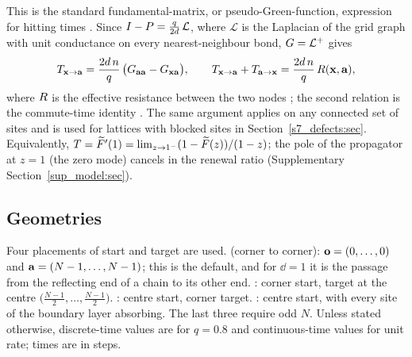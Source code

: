 This is the standard fundamental-matrix, or pseudo-Green-function, expression for hitting times
\citep{AldousFill,Condamin2005,Condamin2007PRE}. Since $I-P=\frac{q}{2d}\,\mathcal L$, where $\mathcal L$ is the
Laplacian of the grid graph with unit conductance on every nearest-neighbour bond, $G=\mathcal L^{+}$ gives
\begin{equation}\label{s2_model:eq-resistance}
  T_{\mathbf{x}\to\mathbf{a}}=\frac{2d\,n}{q}\,\bigl(G_{\mathbf{a}\mathbf{a}}-G_{\mathbf{x}\mathbf{a}}\bigr),\qquad
  T_{\mathbf{x}\to\mathbf{a}}+T_{\mathbf{a}\to\mathbf{x}}=\frac{2d\,n}{q}\,R(\mathbf{x},\mathbf{a}),
\end{equation}
where $R$ is the effective resistance between the two nodes \citep{KleinRandic1993}; the second relation is the
commute-time identity \citep{Chandra1989,Tetali1991,LevinPeresWilmer2009}. The same argument applies on any connected
set of sites and is used for lattices with blocked sites in Section~\ref{s7_defects:sec}. Equivalently,
$T=\widetilde{F}'(1)=\lim_{z\to1^{-}}(1-\widetilde{F}(z))/(1-z)$; the pole of the propagator at $z=1$ (the zero mode) cancels in the
renewal ratio (Supplementary Section~\ref{sup_model:sec}).

\subsection{Geometries}\label{s2_model:ssec-geom}

Four placements of start and target are used. \CC{} (corner to corner): $\mathbf{o}=(0,\dots,0)$ and
$\mathbf{a}=(N-1,\dots,N-1)$; this is the default, and for $\dd=1$ it is the passage from the reflecting end of a chain to
its other end. \CtM{}: corner start, target at the centre $\bigl(\tfrac{N-1}{2},\dots,\tfrac{N-1}{2}\bigr)$. \MtC{}:
centre start, corner target. \EXIT{}: centre start, with every site of the boundary layer absorbing. The last three
require odd $N$. Unless stated otherwise, discrete-time values are for $q=0.8$ and continuous-time values for unit
rate; times are in steps.
